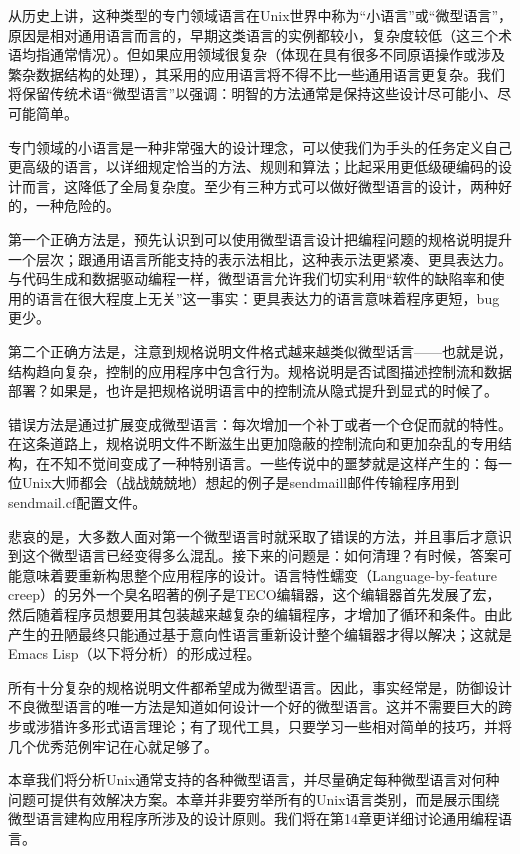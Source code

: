 \documentclass[12pt,oneside]{book}
\begin{document}
\begin{common-format}
从历史上讲，这种类型的专门领域语言在Unix世界中称为“小语言”或“微型语言”，原因是相对通用语言而言的，早期这类语言的实例都较小，复杂度较低（这三个术语均指通常情况）。但如果应用领域很复杂（体现在具有很多不同原语操作或涉及繁杂数据结构的处理），其采用的应用语言将不得不比一些通用语言更复杂。我们将保留传统术语“微型语言”以强调：明智的方法通常是保持这些设计尽可能小、尽可能简单。

专门领域的小语言是一种非常强大的设计理念，可以使我们为手头的任务定义自己更高级的语言，以详细规定恰当的方法、规则和算法；比起采用更低级硬编码的设计而言，这降低了全局复杂度。至少有三种方式可以做好微型语言的设计，两种好的，一种危险的。

第一个正确方法是，预先认识到可以使用微型语言设计把编程问题的规格说明提升一个层次；跟通用语言所能支持的表示法相比，这种表示法更紧凑、更具表达力。与代码生成和数据驱动编程一样，微型语言允许我们切实利用“软件的缺陷率和使用的语言在很大程度上无关”这一事实：更具表达力的语言意味着程序更短，bug更少。

第二个正确方法是，注意到规格说明文件格式越来越类似微型话言——也就是说，结构趋向复杂，控制的应用程序中包含行为。规格说明是否试图描述控制流和数据部署？如果是，也许是把规格说明语言中的控制流从隐式提升到显式的时候了。

错误方法是通过扩展变成微型语言：每次增加一个补丁或者一个仓促而就的特性。在这条道路上，规格说明文件不断滋生出更加隐蔽的控制流向和更加杂乱的专用结构，在不知不觉间变成了一种特别语言。一些传说中的噩梦就是这样产生的：每一位Unix大师都会（战战兢兢地）想起的例子是sendmaill邮件传输程序用到sendmail.cf配置文件。

悲哀的是，大多数人面对第一个微型语言时就采取了错误的方法，并且事后才意识到这个微型语言已经变得多么混乱。接下来的问题是：如何清理？有时候，答案可能意味着要重新构思整个应用程序的设计。语言特性蠕变（Language-by-feature creep）的另外一个臭名昭著的例子是TECO编辑器，这个编辑器首先发展了宏，然后随着程序员想要用其包装越来越复杂的编辑程序，才增加了循环和条件。由此产生的丑陋最终只能通过基于意向性语言重新设计整个编辑器才得以解决；这就是Emacs Lisp（以下将分析）的形成过程。

所有十分复杂的规格说明文件都希望成为微型语言。因此，事实经常是，防御设计不良微型语言的唯一方法是知道如何设计一个好的微型语言。这并不需要巨大的跨步或涉猎许多形式语言理论；有了现代工具，只要学习一些相对简单的技巧，并将几个优秀范例牢记在心就足够了。

本章我们将分析Unix通常支持的各种微型语言，并尽量确定每种微型语言对何种问题可提供有效解决方案。本章并非要穷举所有的Unix语言类别，而是展示围绕微型语言建构应用程序所涉及的设计原则。我们将在第14章更详细讨论通用编程语言。


\end{common-format}
\end{document}
